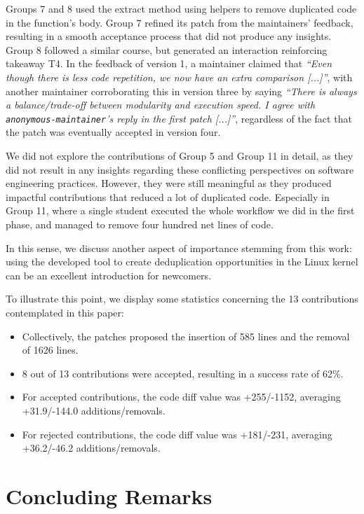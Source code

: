\documentclass[10pt,conference]{IEEEtran}
\begin{document}
Groups 7 and 8 used the extract method using helpers to remove duplicated code in the function's body. Group 7 refined its patch from the maintainers' feedback, resulting in a smooth acceptance process that did not produce any insights. Group 8 followed a similar course, but generated an interaction reinforcing takeaway T4. In the feedback of version 1, a maintainer claimed that \textit{``Even though there is less code repetition, we now have an extra comparison [...]''}, with another maintainer corroborating this in version three by saying \textit{``There is always a balance/trade-off between modularity and execution speed. I agree with \texttt{anonymous-maintainer}'s reply in the first patch [...]''}, regardless of the fact that the patch was eventually accepted in version four.

We did not explore the contributions of Group 5 and Group 11 in detail, as they did not result in any insights regarding these conflicting perspectives on software engineering practices. However, they were still meaningful as they produced impactful contributions that reduced a lot of duplicated code. Especially in Group 11, where a single student executed the whole workflow we did in the first phase, and managed to remove four hundred net lines of code.

In this sense, we discuss another aspect of importance stemming from this work: using the developed tool to create deduplication opportunities in the Linux kernel can be an excellent introduction for newcomers.

To illustrate this point, we display some statistics concerning the 13 contributions contemplated in this paper:

\begin{itemize}
  \item Collectively, the patches proposed the insertion of 585 lines and the removal of 1626 lines.
  \item 8 out of 13 contributions were accepted, resulting in a success rate of 62\%.
  \item For accepted contributions, the code diff value was +255/-1152, averaging +31.9/-144.0 additions/removals.
  \item For rejected contributions, the code diff value was +181/-231, averaging +36.2/-46.2 additions/removals.
\end{itemize}


\section{Concluding Remarks}
\end{document}
